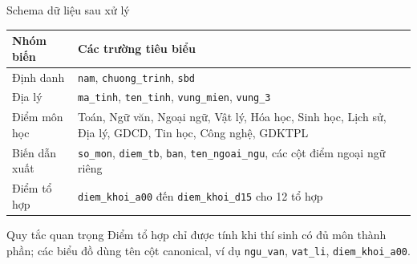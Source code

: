 \documentclass[aspectratio=169,11pt]{beamer}
\begin{document}
\begin{frame}{Schema dữ liệu sau xử lý}
  \small
  \begin{tabular}{@{}p{3.1cm}p{11.5cm}@{}}
    \toprule
    \textbf{Nhóm biến} & \textbf{Các trường tiêu biểu} \\
    \midrule
    Định danh & \texttt{nam}, \texttt{chuong\_trinh}, \texttt{sbd} \\
    Địa lý & \texttt{ma\_tinh}, \texttt{ten\_tinh}, \texttt{vung\_mien}, \texttt{vung\_3} \\
    Điểm môn học & Toán, Ngữ văn, Ngoại ngữ, Vật lý, Hóa học, Sinh học, Lịch sử, Địa lý, GDCD, Tin học, Công nghệ, GDKTPL \\
    Biến dẫn xuất & \texttt{so\_mon}, \texttt{diem\_tb}, \texttt{ban}, \texttt{ten\_ngoai\_ngu}, các cột điểm ngoại ngữ riêng \\
    Điểm tổ hợp & \texttt{diem\_khoi\_a00} đến \texttt{diem\_khoi\_d15} cho 12 tổ hợp \\
    \bottomrule
  \end{tabular}
  \vspace{0.45cm}
  \begin{block}{Quy tắc quan trọng}
    Điểm tổ hợp chỉ được tính khi thí sinh có đủ môn thành phần; các biểu đồ dùng tên cột canonical, ví dụ \texttt{ngu\_van}, \texttt{vat\_li}, \texttt{diem\_khoi\_a00}.
  \end{block}
\end{frame}
\end{document}
